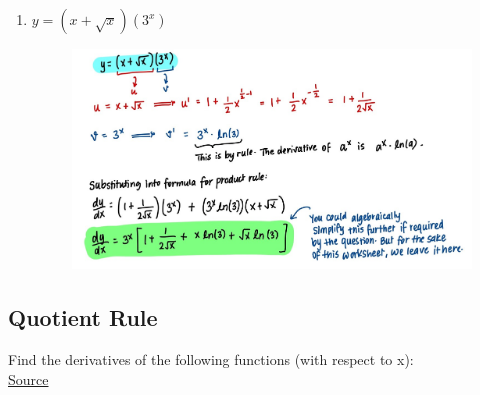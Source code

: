 \documentclass{article}
\begin{document}
\begin{enumerate}
\begin{figure}[H]
        \label{fig:Q1.3}
    \end{figure}
    \item $y = (x+\sqrt{x})(3^x)$
    \begin{figure}[H]
        \centering
        \includegraphics[width= 0.9\linewidth]{Q1.4.jpg}
        \label{fig:Q1.4}
    \end{figure}
\end{enumerate}

\subsection*{Quotient Rule}
Find the derivatives of the following functions (with respect to x):\\
\noindent \href{https://web.auburn.edu/holmerr/1617/Textbook/productquotient-screen.pdf}{Source}
\end{document}
